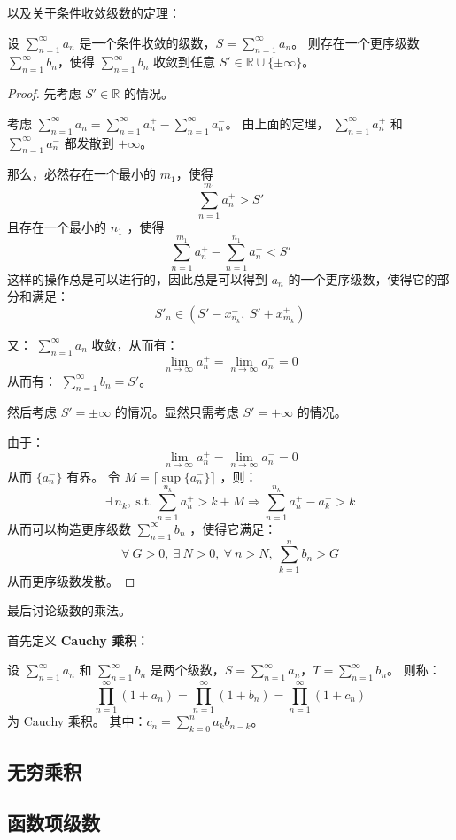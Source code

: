 以及关于条件收敛级数的定理：

\begin{theorem}[Riemann]\label{thm:riemann-rearrangement-theorem}
  设 $\sum_{n=1}^{\infty} a_n$ 是一个条件收敛的级数，$S = \sum_{n=1}^{\infty} a_n$。
  则存在一个更序级数 $\sum_{n=1}^{\infty} b_n$，使得 $\sum_{n=1}^{\infty} b_n$ 收敛到任意 $S' \in \mathbb{R} \cup \{\pm\infty \}$。
\end{theorem}

\begin{proof}
  先考虑 $S' \in \mathbb{R}$ 的情况。

  考虑 $\sum_{n=1}^{\infty} a_n = \sum_{n=1}^{\infty} a_n^+ - \sum_{n=1}^{\infty} a_n^-$。
  由上面的定理， $\sum_{n=1}^{\infty} a_n^+$ 和 $\sum_{n=1}^{\infty} a_n^-$ 都发散到 $+\infty$。

  那么，必然存在一个最小的 $m_1$，使得 $$\sum_{n=1}^{m_1} a_n^+ > S'$$
  且存在一个最小的 $n_1$ ，使得 $$\sum_{n=1}^{m_1} a_n^+ - \sum_{n=1}^{n_1} a_n^- < S'$$
  这样的操作总是可以进行的，因此总是可以得到 $a_n$ 的一个更序级数，使得它的部分和满足：
  $$S'_n \in (S' - x_{n_k}^-,\ S' + x_{m_k}^+)$$

  又： $\sum_{n=1}^{\infty} a_n$ 收敛，从而有：
  $$\lim_{n\to \infty} a_n^+ = \lim_{n\to \infty} a_n^- = 0$$
  从而有： $\sum_{n=1}^{\infty} b_n = S'$。

  然后考虑 $S' = \pm \infty$ 的情况。显然只需考虑 $S' = +\infty$ 的情况。

  由于： $$\lim_{n\to \infty} a_n^+ = \lim_{n\to \infty} a_n^- = 0$$
  从而 $\{a_n^-\}$ 有界。
  令 $M = \lceil \sup \{a_n^-\} \rceil$ ，则：
  $$\exists\ n_k,\ \mathrm{s.t.}\ \sum_{n=1}^{n_k} a_n^+ > k + M \Rightarrow \sum_{n=1}^{n_k} a_n^+ - a_k^- > k$$
  从而可以构造更序级数 $\sum_{n=1}^{\infty} b_n$ ，使得它满足：
  $$\forall\ G>0,\ \exists\ N > 0,\ \forall\ n > N,\ \sum_{k=1}^{n} b_n > G$$
  从而更序级数发散。
\end{proof}

最后讨论级数的乘法。

首先定义\textbf{ Cauchy 乘积}：

\begin{definition}[Cauchy 乘积]\label{def:cauchy-product}
  设 $\sum_{n=1}^{\infty} a_n$ 和 $\sum_{n=1}^{\infty} b_n$ 是两个级数，$S = \sum_{n=1}^{\infty} a_n$，$T = \sum_{n=1}^{\infty} b_n$。
  则称：
  \begin{equation*}
    \prod_{n=1}^{\infty} (1 + a_n) = \prod_{n=1}^{\infty} (1 + b_n) = \prod_{n=1}^{\infty} (1 + c_n)
  \end{equation*}
  为 Cauchy 乘积。
  其中：$c_n = \sum_{k=0}^{n} a_k b_{n-k}$。
\end{definition}


\subsection{无穷乘积}\label{subsec:infinite-product}


\subsection{函数项级数}\label{subsec:function-series}

